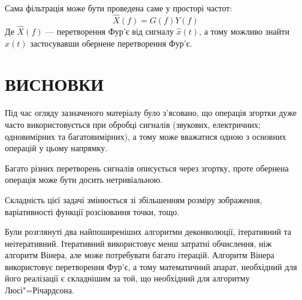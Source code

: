 \documentclass[simple,14pt,utf8,ukrainian]{eskdtext}
\begin{document}
  Сама фільтрація може бути проведена саме у просторі частот:
  \[
    \hat{X}(f) = G(f)Y(f)
  \]
  Де $\hat{X}(f)$ --- перетворення Фур’є від сигналу $\hat{x}(t)$, а тому
  можливо знайти $\hat{x}(t)$ застосувавши обернене перетворення Фур’є.
  \clearpage

\section{ВИСНОВКИ}
Під час огляду зазначеного матеріалу було з’ясовано, що операція згортки
дуже часто використовується при обробці сигналів (звукових, електричних;
одновимірних та багатовимірних), а тому може вважатися одною з основних
операцій у цьому напрямку.

Багато різних перетворень сигналів описується через згортку, проте
обернена операція може бути досить нетривіальною.

Складність цієї задачі змінюється зі збільшенням розміру зображення,
варіативності функції розсіювання точки, тощо.

Були розглянуті два найпоширеніших алгоритми деконволюції, ітеративний та
неітеративний.
Ітеративний використовує менш затратні обчислення, ніж алгоритм Вінера,
але може потребувати багато ітерацій.
Алгоритм Вінера використовує перетворення Фур’є, а тому математичний
апарат, необхідний для його реалізації є складнішим за той, що необхідний
для алгоритму Люсі"=Річардсона.




\end{document}
